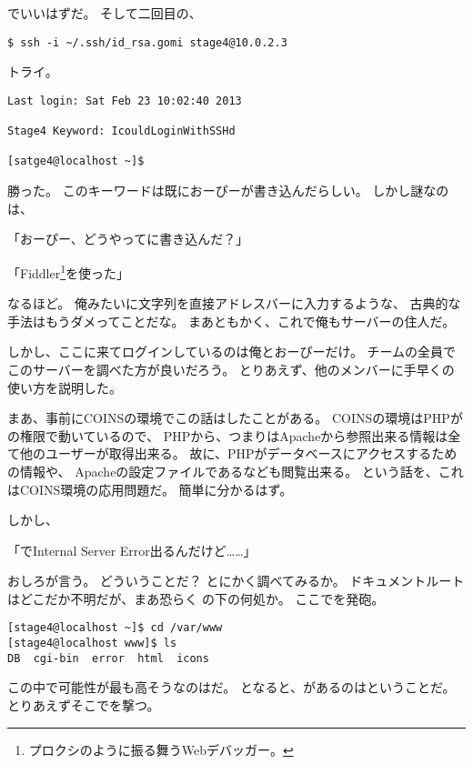 \begin{multicols}{2}

でいいはずだ。
そして二回目の、

\begin{lstlisting}
$ ssh -i ~/.ssh/id_rsa.gomi stage4@10.0.2.3
\end{lstlisting}

トライ。

\begin{lstlisting}
Last login: Sat Feb 23 10:02:40 2013

Stage4 Keyword: IcouldLoginWithSSHd

[satge4@localhost ~]$
\end{lstlisting}

勝った。
このキーワードは既におーぴーが書き込んだらしい。
しかし謎なのは、

「おーぴー、どうやってに書き込んだ？」

「Fiddler\footnote{プロクシのように振る舞うWebデバッガー。}を使った」

なるほど。
俺みたいに文字列を直接アドレスバーに入力するような、
古典的な手法はもうダメってことだな。
まあともかく、これで俺もサーバーの住人だ。

しかし、ここに来てログインしているのは俺とおーぴーだけ。
チームの全員でこのサーバーを調べた方が良いだろう。
とりあえず、他のメンバーに手早くの使い方を説明した。

まあ、事前にCOINSの環境でこの話はしたことがある。
COINSの環境はPHPがの権限で動いているので、
PHPから、つまりはApacheから参照出来る情報は全て他のユーザーが取得出来る。
故に、PHPがデータベースにアクセスするための情報や、
Apacheの設定ファイルであるなども閲覧出来る。
という話を、これはCOINS環境の応用問題だ。
簡単に分かるはず。

しかし、

「でInternal Server Error出るんだけど……」

おしろが言う。
どういうことだ？
とにかく調べてみるか。
ドキュメントルートはどこだか不明だが、まあ恐らく
の下の何処か。
ここでを発砲。

\begin{lstlisting}
[stage4@localhost ~]$ cd /var/www
[stage4@localhost www]$ ls
DB  cgi-bin  error  html  icons
\end{lstlisting}

この中で可能性が最も高そうなのはだ。
となると、があるのはということだ。
とりあえずそこでを撃つ。


\end{multicols}
